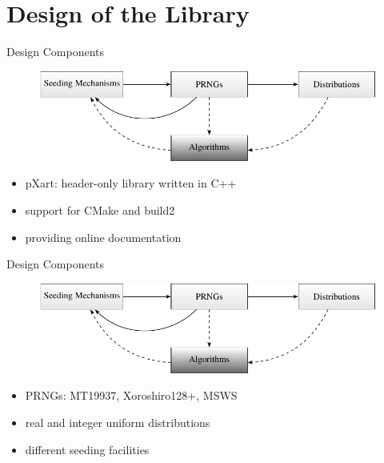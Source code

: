 \documentclass[aspectratio=169]{beamer}
\begin{document}
  \section{Design of the Library} %
  \label{sec:design}
    \begin{frame}{Design Components}
      \begin{figure}
        \includegraphics[width=\textwidth]{figures/api_parts.pdf}
      \end{figure}
      \begin{itemize}
        \pause\item pXart: header-only library written in C++
        \pause\item support for CMake and build2
        \pause\item providing online documentation
      \end{itemize}
    \end{frame}
    \begin{frame}{Design Components}
      \begin{figure}
        \includegraphics[width=\textwidth]{figures/api_parts.pdf}
      \end{figure}
      \begin{itemize}
        \pause\item PRNGs: MT19937, Xoroshiro128+, MSWS
        \pause\item real and integer uniform distributions
        \pause\item different seeding facilities
      \end{itemize}
    \end{frame}
\end{document}
